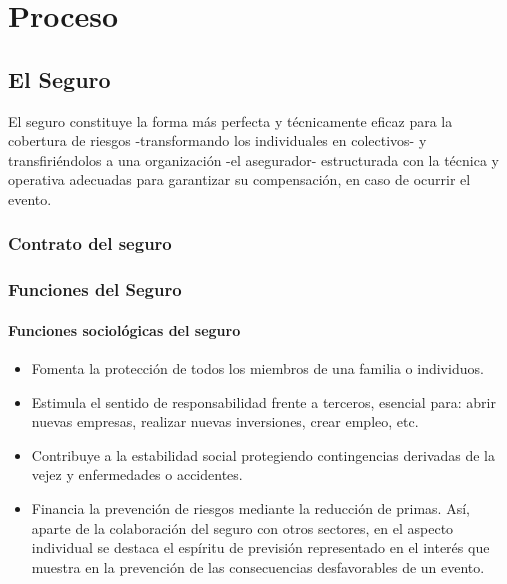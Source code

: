 \chapter{Proceso}

\section{El Seguro}	

El seguro constituye la forma más perfecta y técnicamente eficaz para la cobertura de riesgos -transformando los individuales en colectivos- y transfiriéndolos a una organización -el asegurador- estructurada con la técnica y operativa adecuadas para garantizar su compensación, en caso de ocurrir el evento.

\subsection{Contrato del seguro}
\setlength{\parskip}{5mm}
\setlength{\parskip}{0mm}


\subsection{Funciones del Seguro}
\setlength{\parskip}{5mm}



\setlength{\parskip}{0mm}

\subsubsection{Funciones sociológicas del seguro}

\begin{itemize}
	\item Fomenta la  protección de todos los miembros de una familia o individuos.

	\item Estimula el sentido de responsabilidad frente a terceros, esencial para: abrir nuevas empresas, realizar nuevas inversiones, crear empleo, etc.

	\item Contribuye a la estabilidad social protegiendo contingencias derivadas de la vejez y enfermedades o 
	accidentes.

	\item Financia la prevención de riesgos mediante la reducción de primas. Así, aparte de la colaboración del seguro con otros sectores, en el aspecto individual se destaca el espíritu de previsión representado en el interés que muestra en la prevención de las consecuencias desfavorables de un evento.

\end{itemize}

